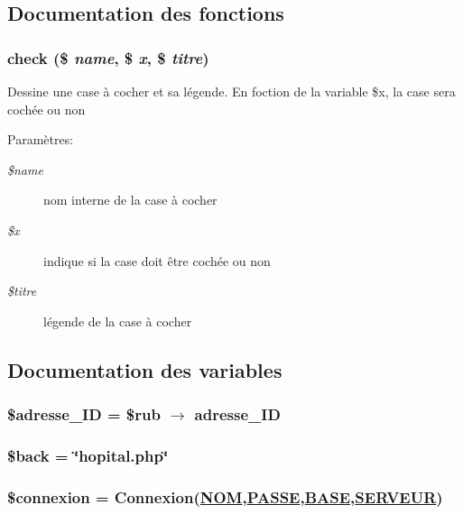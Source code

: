 \subsection{Documentation des fonctions}
\hypertarget{hopital_8php_a12}{
\subsubsection[check]{\setlength{\rightskip}{0pt plus 5cm}check (\$ {\em name}, \$ {\em x}, \$ {\em titre})}}
\label{hopital_8php_a12}


Dessine une case \`{a} cocher et sa l\'{e}gende. En foction de la variable \$x, la case sera coch\'{e}e ou non \begin{Desc}
\item[Param\`{e}tres:]
\begin{description}
\item[{\em \$name}]nom interne de la case \`{a} cocher \item[{\em \$x}]indique si la case doit \^{e}tre coch\'{e}e ou non \item[{\em \$titre}]l\'{e}gende de la case \`{a} cocher \end{description}
\end{Desc}


\subsection{Documentation des variables}
\hypertarget{hopital_8php_a4}{
\subsubsection[\$adresse\_\-ID]{\setlength{\rightskip}{0pt plus 5cm}\$adresse\_\-ID = \$rub $\rightarrow$ adresse\_\-ID}}
\label{hopital_8php_a4}


\hypertarget{hopital_8php_a10}{
\subsubsection[\$back]{\setlength{\rightskip}{0pt plus 5cm}\$back = \char`\"{}hopital.php\char`\"{}}}
\label{hopital_8php_a10}


\hypertarget{hopital_8php_a0}{
\subsubsection[\$connexion]{\setlength{\rightskip}{0pt plus 5cm}\$connexion = Connexion(\hyperlink{pma__connect_8php_a0}{NOM},\hyperlink{pma__connect_8php_a1}{PASSE},\hyperlink{pma__connect_8php_a3}{BASE},\hyperlink{pma__connect_8php_a2}{SERVEUR})}}
\label{hopital_8php_a0}


